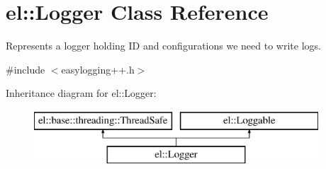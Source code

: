 \hypertarget{classel_1_1_logger}{}\section{el\+:\+:Logger Class Reference}
\label{classel_1_1_logger}


Represents a logger holding I\+D and configurations we need to write logs.  




{\ttfamily \#include $<$easylogging++.\+h$>$}

Inheritance diagram for el\+:\+:Logger\+:\begin{figure}[H]
\begin{center}
\leavevmode
\includegraphics[height=2.000000cm]{classel_1_1_logger}
\end{center}
\end{figure}
